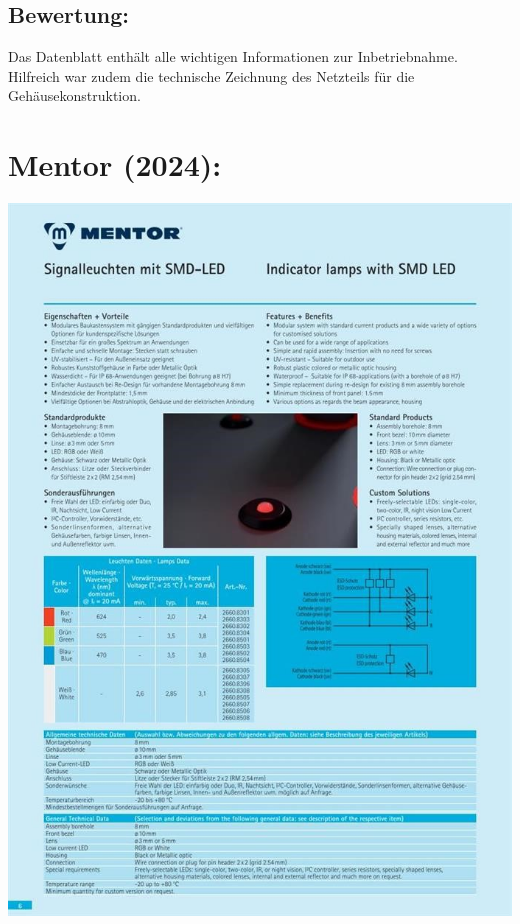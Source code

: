 \subsection*{Bewertung:}
Das Datenblatt enthält alle wichtigen Informationen zur Inbetriebnahme. Hilfreich war zudem die technische Zeichnung des Netzteils für die Gehäusekonstruktion.

\section*{Mentor (2024):}
\begin{minipage}{0.5\textwidth}
	\includegraphics[width=\linewidth]{../Appendix/Literaturverzeichnis/img/Mentor.jpg}
\end{minipage}
\hfill

